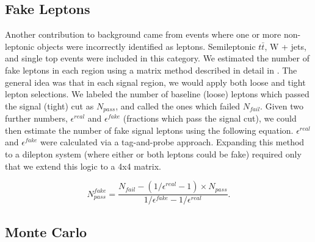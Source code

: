 \subsection*{Fake Leptons}

Another contribution to background came from events where one or more non-leptonic objects were incorrectly identified as leptons. Semileptonic $t\bar{t}$, W + jets, and single top events were included in this category. We estimated the number of fake leptons in each region using a matrix method described in detail in \cite{fake_method}. The general idea was that in each signal region, we would apply both loose and tight lepton selections. We labeled the number of baseline (loose) leptons which passed the signal (tight) cut as $N_{pass}$, and called the ones which failed $N_{fail}$. Given two further numbers, $\epsilon^{real}$ and $\epsilon^{fake}$ (fractions which pass the signal cut), we could then estimate the number of fake signal leptons using the following equation. $\epsilon^{real}$ and $\epsilon^{fake}$ were calculated via a tag-and-probe approach. Expanding this method to a dilepton system (where either or both leptons could be fake) required only that we extend this logic to a 4x4 matrix.

\begin{equation}
N_{pass}^{fake} = \frac{N_{fail}-(1/\epsilon^{real}-1)\times N_{pass}}{1/\epsilon^{fake}-1/\epsilon^{real}}.
\end{equation}


\subsection*{Monte Carlo}

